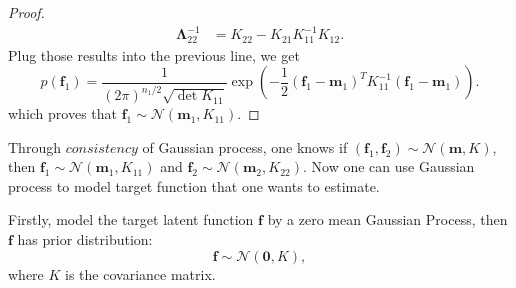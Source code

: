 \documentclass[11pt,a4paper]{article}
\theoremstyle{definition}
\numberwithin{equation}{section}
\let\vec\mathbf
\begin{document}
\begin{proof}
\begin{equation*}
\begin{split}
		\vec \Lambda_{22}^{-1} &= K_{22}-K_{21}K_{11}^{-1}K_{12}.
		\end{split}
		\end{equation*}
		Plug those results into the previous line, we get
		\begin{equation*} \label{}
		p(\vec f_1) = \frac{1}{(2\pi)^{n_1/2}\sqrt{\det K_{11}}} \exp{\left(-\frac{1}{2}\left(\vec f_1 - \vec m_1\right)^TK_{11}^{-1}\left(\vec f_1 - \vec m _1 \right)\right)}.
		\end{equation*}
		which proves that $\vec f_1\sim\mathcal{N}(\vec m_1,K_{11})$.
	\end{proof}
	
	Through $consistency$ of Gaussian process, one knows if $\left(\vec f_1, \vec f_2\right)\sim \mathcal N \left(\vec m , K \right)$, then $\vec f_1 \sim   \mathcal N \left(\vec m_1 , K_{11} \right)$ and $ \vec f_2 \sim  \mathcal N \left(\vec m_2 , K_{22} \right)$. Now one can use Gaussian process to model target function that one wants to estimate.
	
	Firstly, model the target latent function $\vec f$ by a zero mean Gaussian Process, then $\vec f$ has prior distribution:
	\begin{equation} \label{noise-free}
	\vec f \sim \mathcal{N}(\vec 0, K),
	\end{equation}
	where $K$ is the covariance matrix.
	
\end{document}
